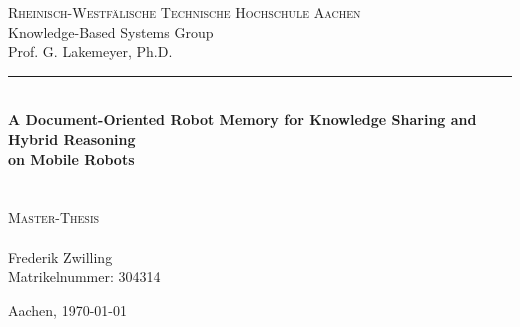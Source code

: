 \begin{titlepage}
  
  \begin{center}
    
    \Large
    \textsc{Rheinisch-Westfälische Technische Hochschule Aachen}\\
    Knowledge-Based Systems Group\\
    Prof. G. Lakemeyer, Ph.D.\\
    
    \vspace{4cm}
    

    \hrule \\
    [0.4cm]
           {
             \Huge 
             \bfseries
             A Document-Oriented Robot Memory for Knowledge Sharing and Hybrid Reasoning\\ on Mobile Robots\\
           }\\
   [0.4cm]
   \hline \\
   [1.5cm]
   
    \textsc{Master-Thesis}\\
    \\
    [1.2cm]
    \large Frederik Zwilling\\
    \normalsize
    Matrikelnummer: 304314\\

    \vspace{7cm}
    
    Aachen, \today
  \end{center}

\end{titlepage}
